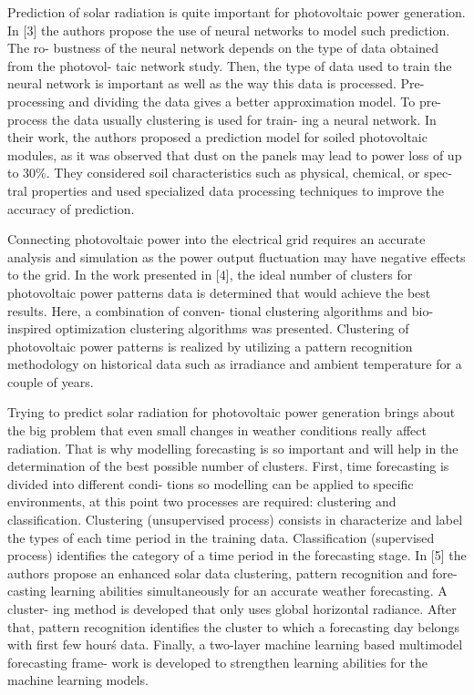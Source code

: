 \documentclass[a4paper,12pt]{article}
\begin{document}
Prediction of solar radiation is quite important for photovoltaic power generation. In
[3] the authors propose the use of neural networks to model such prediction. The ro-
bustness of the neural network depends on the type of data obtained from the photovol-
taic network study. Then, the type of data used to train the neural network is important
as well as the way this data is processed. Pre-processing and dividing the data gives a
better approximation model. To pre-process the data usually clustering is used for train-
ing a neural network. In their work, the authors proposed a prediction model for soiled
photovoltaic modules, as it was observed that dust on the panels may lead to power loss of up to 30\%. They considered soil characteristics such as physical, chemical, or spec-
tral properties and used specialized data processing techniques to improve the accuracy
of prediction.  

Connecting photovoltaic power into the electrical grid requires an accurate analysis
and simulation as the power output fluctuation may have negative effects to the grid. In
the work presented in [4], the ideal number of clusters for photovoltaic power patterns
data is determined that would achieve the best results. Here, a combination of conven-
tional clustering algorithms and bio-inspired optimization clustering algorithms was
presented. Clustering of photovoltaic power patterns is realized by utilizing a pattern
recognition methodology on historical data such as irradiance and ambient temperature
for a couple of years.  

Trying to predict solar radiation for photovoltaic power generation brings about the
big problem that even small changes in weather conditions really affect radiation. That
is why modelling forecasting is so important and will help in the determination of the
best possible number of clusters. First, time forecasting is divided into different condi-
tions so modelling can be applied to specific environments, at this point two processes
are required: clustering and classification. Clustering (unsupervised process) consists
in characterize and label the types of each time period in the training data. Classification
(supervised process) identifies the category of a time period in the forecasting stage. In
[5] the authors propose an enhanced solar data clustering, pattern recognition and fore-
casting learning abilities simultaneously for an accurate weather forecasting. A cluster-
ing method is developed that only uses global horizontal radiance. After that, pattern
recognition identifies the cluster to which a forecasting day belongs with first few
hour\'s data. Finally, a two-layer machine learning based multimodel forecasting frame-
work is developed to strengthen learning abilities for the machine learning models.
\end{document}
